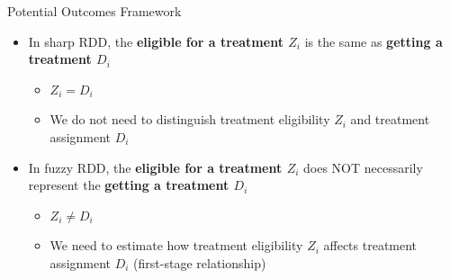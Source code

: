 \documentclass[dvipsnames,hyperref={pdfpagelabels=false}]{beamer}
\begin{document}
\begin{frame}{Potential Outcomes Framework}{}
	\begin{itemize}
		
		\item In sharp RDD, the \textbf{eligible for a treatment $Z_{i}$} is the same as \textbf{getting a treatment $D_{i}$} 
		\vspace{0.2cm}
		\begin{itemize}
			\item $Z_{i}=D_{i}$
					\vspace{0.2cm}
			
			\item We do not need to distinguish treatment eligibility $Z_{i}$ and treatment assignment $D_{i}$
		\end{itemize}
		
		\vspace{0.2cm}
		\item In fuzzy RDD, the \textbf{eligible for a treatment $Z_{i}$} does NOT necessarily represent the \textbf{getting a treatment $D_{i}$} 
		
		\vspace{0.2cm}
		\begin{itemize}
			\item $Z_{i}\neq D_{i}$
			
			\vspace{0.2cm}
			
			\item We need to estimate how treatment eligibility $Z_{i}$ affects treatment assignment $D_{i}$ (first-stage relationship)
		\end{itemize}
		
		
		
		
		
	\end{itemize}
\end{frame}
\end{document}
